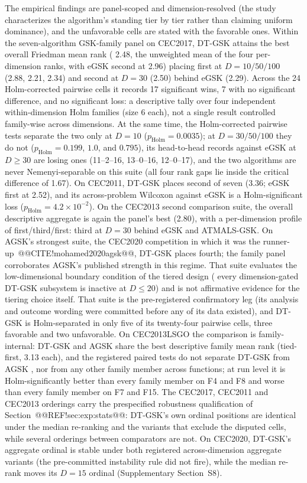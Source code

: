 \documentclass[10pt,a4paper]{article}
\newcommand{\dtgsk}{DT-GSK}
\newcommand{\atmals}{ATMALS-GSK}
\newcommand{\agsk}{AGSK}
\newcommand{\egsk}{eGSK}
\begin{document}
The empirical findings are panel-scoped and dimension-resolved (the
study characterizes the algorithm's standing tier by tier rather than
claiming uniform dominance), and the unfavorable cells are stated with
the favorable ones. Within the seven-algorithm GSK-family panel
on CEC2017, \dtgsk{} attains the best overall Friedman mean rank (
2.48, the unweighted mean of the four per-dimension ranks, with
\egsk{} second at 2.96) placing first at $D = 10/50/100$ (2.88,
2.21, 2.34) and second at $D = 30$ (2.50) behind \egsk{}
(2.29). 
Across the 24 Holm-corrected pairwise cells it records 17 significant
wins, 7 with no significant difference, and no significant loss: a
descriptive tally over four independent within-dimension Holm families
(size 6 each), not a single result controlled family-wise across
dimensions. 
At the same time, the Holm-corrected pairwise tests separate the two only at
$D = 10$ ($p_{\mathrm{Holm}} = 0.0035$); at $D = 30/50/100$ they do not
($p_{\mathrm{Holm}} = 0.199$, $1.0$, and $0.795$), its head-to-head records
against \egsk{} at $D \geq 30$ are losing ones (11--2--16, 13--0--16,
12--0--17), and the two algorithms are never Nemenyi-separable on this suite
(all four rank gaps lie inside the critical difference of
1.67). 
On CEC2011, \dtgsk{} places second of seven (3.36; \egsk{} first at
2.52), and its across-problem Wilcoxon against \egsk{} is a
Holm-significant loss
($p_{\mathrm{Holm}} = 4.2 \times 10^{-2}$). 
On the CEC2013 second comparison suite, the overall descriptive
aggregate is again the panel's best (2.80), with a per-dimension
profile of first/third/first: third at $D = 30$ behind \egsk{} and
\atmals{}. 
On AGSK's strongest suite, the CEC2020 competition in which it was
the runner-up~@@CITE!mohamed2020agsk@@, \dtgsk{} places fourth; the family
panel corroborates AGSK's published strength in this regime.  That suite
evaluates the low-dimensional boundary condition of the tiered design (
every dimension-gated \dtgsk{} subsystem is inactive at $D \leq 20$)
and is not affirmative evidence for the tiering choice itself. That suite is the pre-registered confirmatory
leg (its analysis and outcome wording were committed before any of
its data existed), and \dtgsk{} is Holm-separated in only five of its
twenty-four pairwise cells, three favorable and two
unfavorable. 
On CEC2013LSGO the comparison is family-internal: \dtgsk{} and \agsk{}
share the best descriptive family mean rank (tied-first, 3.13 each),
and the registered paired tests do not separate \dtgsk{} from \agsk{}
, nor from any other family member across functions; at run level it
is Holm-significantly better than every family member on F4 and F8 and
worse than every family member on F7 and
F15. 
The CEC2017, CEC2011 and CEC2013 orderings carry the prespecified
robustness qualification of Section~@@REF!sec:exp:stats@@: \dtgsk{}'s own ordinal
positions are identical under the median re-ranking and the
variants that exclude the disputed cells, while several orderings between
comparators are not. On CEC2020, \dtgsk{}'s aggregate ordinal is stable
under both registered across-dimension aggregate variants (the
pre-committed instability rule did not fire), while the median re-rank
moves its $D = 15$ ordinal
(Supplementary Section~S8). 
\end{document}
